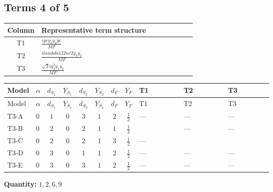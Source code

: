 \documentclass[8pt]{article}
\begin{document}
\begin{landscape}
\subsection*{Terms 4 of 5}
\begin{center}
\begin{tabular}{@{}c >{\raggedright\arraybackslash}p{0.82\linewidth}@{}}
\toprule
Column & Representative term structure \\
\midrule
T1 & \(\displaystyle \frac{i ye \overline{y_{1}} \overline{y_{2}} \overline{ye}}{MF}\) \\
\midrule
T2 & \(\displaystyle \frac{i lambda12Inv2 \overline{y_{1}} \overline{y_{2}}}{MF}\) \\
\midrule
T3 & \(\displaystyle \frac{\sqrt{3} i g_{2}^{2} \overline{y_{1}} \overline{y_{2}}}{MF}\) \\
\midrule
\bottomrule
\end{tabular}
\end{center}
\smallskip
\tiny
\begin{longtable}{@{}llcccccc >{\raggedright\arraybackslash}p{0.21\linewidth} >{\raggedright\arraybackslash}p{0.21\linewidth} >{\raggedright\arraybackslash}p{0.21\linewidth}@{}}
\toprule
Model & $\alpha$ & $d_{S_1}$ & $Y_{S_1}$ & $d_{S_2}$ & $Y_{S_2}$ & $d_F$ & $Y_F$ & T1 & T2 & T3 \\
\midrule
\endfirsthead
\toprule
Model & $\alpha$ & $d_{S_1}$ & $Y_{S_1}$ & $d_{S_2}$ & $Y_{S_2}$ & $d_F$ & $Y_F$ & T1 & T2 & T3 \\
\midrule
\endhead
T3-A & $0$ & $1$ & $0$ & $3$ & $1$ & $2$ & $\frac{1}{2}$ & --- & --- & --- \\
\midrule
T3-B & $0$ & $2$ & $0$ & $2$ & $1$ & $1$ & $\frac{1}{2}$ & \scriptsize\adjustbox{max width=\linewidth}{$\begin{gathered} \frac{i ye \overline{y_{1}} \overline{y_{2}} \overline{ye}}{8 MF}\end{gathered}$} & --- & --- \\
\midrule
T3-C & $0$ & $2$ & $0$ & $2$ & $1$ & $3$ & $\frac{1}{2}$ & --- & \scriptsize\adjustbox{max width=\linewidth}{$\begin{gathered} \frac{i lambda12Inv2 \overline{y_{1}} \overline{y_{2}}}{6 MF}\end{gathered}$} & \scriptsize\adjustbox{max width=\linewidth}{$\begin{gathered} \frac{\sqrt{3} i g_{2}^{2} \overline{y_{1}} \overline{y_{2}}}{8 MF}\end{gathered}$} \\
\midrule
T3-D & $0$ & $3$ & $0$ & $1$ & $1$ & $2$ & $\frac{1}{2}$ & --- & --- & --- \\
\midrule
T3-E & $0$ & $3$ & $0$ & $3$ & $1$ & $2$ & $\frac{1}{2}$ & --- & --- & --- \\
\midrule
\bottomrule
\end{longtable}
\clearpage
\noindent\textbf{Quantity: }$\mathrm{1,2,6,9}$\par\smallskip

\end{landscape}
\end{document}
